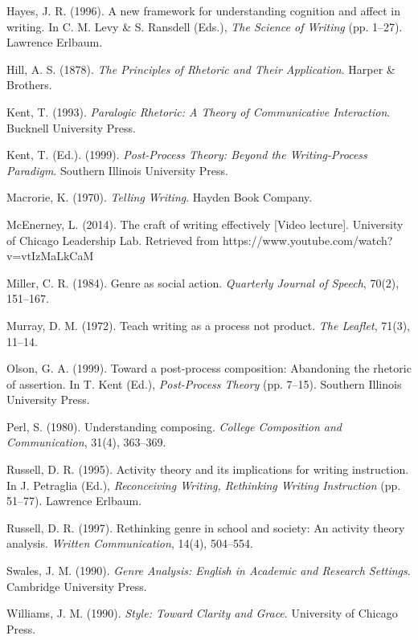 \documentclass[12pt]{article}
\begin{document}
Hayes, J. R. (1996). A new framework for understanding cognition and affect in writing. In C. M. Levy \& S. Ransdell (Eds.), \textit{The Science of Writing} (pp. 1--27). Lawrence Erlbaum.

Hill, A. S. (1878). \textit{The Principles of Rhetoric and Their Application}. Harper \& Brothers.

Kent, T. (1993). \textit{Paralogic Rhetoric: A Theory of Communicative Interaction}. Bucknell University Press.

Kent, T. (Ed.). (1999). \textit{Post-Process Theory: Beyond the Writing-Process Paradigm}. Southern Illinois University Press.

Macrorie, K. (1970). \textit{Telling Writing}. Hayden Book Company.

McEnerney, L. (2014). The craft of writing effectively [Video lecture]. University of Chicago Leadership Lab. Retrieved from https://www.youtube.com/watch?v=vtIzMaLkCaM

Miller, C. R. (1984). Genre as social action. \textit{Quarterly Journal of Speech}, 70(2), 151--167.

Murray, D. M. (1972). Teach writing as a process not product. \textit{The Leaflet}, 71(3), 11--14.

Olson, G. A. (1999). Toward a post-process composition: Abandoning the rhetoric of assertion. In T. Kent (Ed.), \textit{Post-Process Theory} (pp. 7--15). Southern Illinois University Press.

Perl, S. (1980). Understanding composing. \textit{College Composition and Communication}, 31(4), 363--369.

Russell, D. R. (1995). Activity theory and its implications for writing instruction. In J. Petraglia (Ed.), \textit{Reconceiving Writing, Rethinking Writing Instruction} (pp. 51--77). Lawrence Erlbaum.

Russell, D. R. (1997). Rethinking genre in school and society: An activity theory analysis. \textit{Written Communication}, 14(4), 504--554.

Swales, J. M. (1990). \textit{Genre Analysis: English in Academic and Research Settings}. Cambridge University Press.

Williams, J. M. (1990). \textit{Style: Toward Clarity and Grace}. University of Chicago Press.
\end{document}
